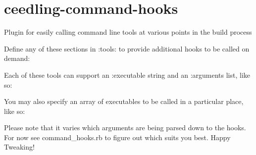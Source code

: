 \chapter{ceedling-\/command-\/hooks}
\hypertarget{md__unit_test_framework2_2vendor_2ceedling_2plugins_2command__hooks_2_r_e_a_d_m_e}{}\label{md__unit_test_framework2_2vendor_2ceedling_2plugins_2command__hooks_2_r_e_a_d_m_e}
Plugin for easily calling command line tools at various points in the build process

Define any of these sections in \+:tools\+: to provide additional hooks to be called on demand\+:


\begin{DoxyCode}{0}

\end{DoxyCode}


Each of these tools can support an \+:executable string and an \+:arguments list, like so\+:


\begin{DoxyCode}{0}

\end{DoxyCode}


You may also specify an array of executables to be called in a particular place, like so\+:


\begin{DoxyCode}{0}

\end{DoxyCode}


Please note that it varies which arguments are being parsed down to the hooks. For now see {\ttfamily command\+\_\+hooks.\+rb} to figure out which suits you best. Happy Tweaking! 
